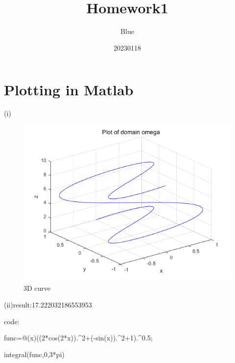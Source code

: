 \documentclass{article}
\title{Homework1}
\author{Blue}
\date{20230118}
\begin{document}
\maketitle

\section{Plotting in Matlab}
\noindent(i)
\begin{figure}[H]
\centering
\includegraphics{plot.png}
\caption{3D curve}
\end{figure}
\noindent (ii)result:17.222032186553953\par
code:\par
func=@(x)((2*cos(2*x)).\^{}2+(-sin(x)).\^{}2+1).\^{}0.5;\par
integral(func,0,3*pi)\par
\end{document}
